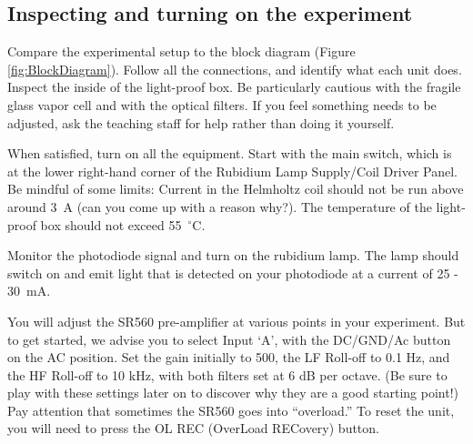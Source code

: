 \documentclass{../lab}
\begin{document}

\subsection{Inspecting and turning on the experiment}

Compare the experimental setup to the block diagram (Figure \ref{fig:BlockDiagram}).  Follow all the connections, and identify what each unit does.  Inspect the inside of the light-proof box.  Be particularly cautious with the fragile glass vapor cell and with the optical filters.  If you feel something needs to be adjusted, ask the teaching staff for help rather than doing it yourself.

When satisfied, turn on all the equipment.  Start with the main switch, which is at the lower right-hand corner of the Rubidium Lamp Supply/Coil Driver Panel.  Be mindful of some limits: Current in the Helmholtz coil should not be run above around 3~A (can you come up with a reason why?).  The temperature of the light-proof box should not exceed 55~$^\circ$C.

Monitor the photodiode signal and turn on the rubidium lamp. The lamp should switch on and emit light that is detected on your photodiode at a current of 25 - 30~mA.

You will adjust the SR560 pre-amplifier at various points in your experiment.  But to get started, we advise you to select Input `A', with the DC/GND/Ac button on the AC position.  Set the gain initially to 500, the LF Roll-off to 0.1 Hz, and the HF Roll-off to 10 kHz, with both filters set at 6 dB per octave.  (Be sure to play with these settings later on to discover why they are a good starting point!)  Pay attention that sometimes the SR560 goes into ``overload.''  To reset the unit, you will need to press the OL REC (OverLoad RECovery) button.
\end{document}
